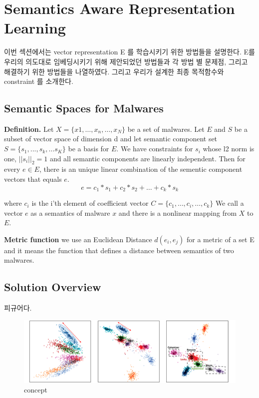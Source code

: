 \section{Semantics Aware Representation Learning}
이번 섹션에서는 vector representation E 를 학습시키기 위한 방법들을 설명한다. E를 우리의 의도대로 임베딩시키기 위해 제안되었던 방법들과 각 방법 별 문제점, 그리고 해결하기 위한 방법들을 나열하였다. 그리고 우리가 설계한 최종 목적함수와 constraint 를 소개한다. 

\subsection{Semantic Spaces for Malwares}

\textbf{Definition. }
Let $X = \{x1, …, x_n, …, x_N\}$ be a set of malwares.
Let $E$ and $S$ be a subset of vector space of dimension d and let semantic component set $S = \{s_1, ... , s_k, … s_K\}$ be a basis for $E$. We have constraints for $s_i$ whose l2 norm is one, $||s_i||_2 = 1$ and all semantic components are linearly independent.  
Then for every $e \in E$, there is an unique linear combination of the sementic component vectors that equals $e$.
\[
e = c_1*s_1 + c_2*s_2 + … + c_k*s_k 
\]

where $c_i$ is the i’th element of coefficient vector $ C = \{c_1, …, c_i, …, c_k\}$
We call a vector $e$ as a semantics of malware $x$ and there is a nonlinear mapping from $X$ to $E$. 

\textbf{Metric function}
we use an Euclidean Distance $d(e_i, e_j)$ for a metric of a set E and it means the function that defines a distance between  semantics of two malwares. 



\subsection{Solution Overview}
피규어다.
\begin{figure}
  \includegraphics[width=\textwidth]{../figures/concept.pdf}
  \caption{concept}
  \label{fig:three}
\end{figure}


